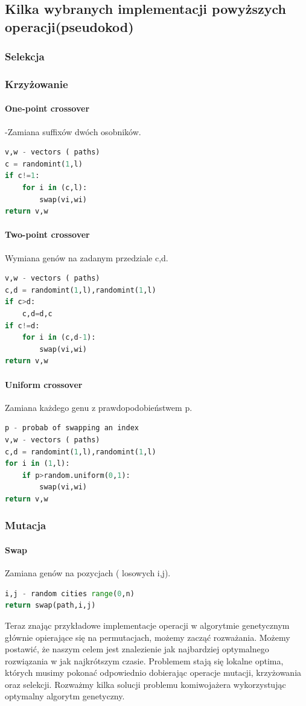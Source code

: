 \documentclass[11pt]{article}
\begin{document}
\subsection{Kilka wybranych implementacji powyższych operacji(pseudokod)}
\subsubsection{Selekcja}




\subsubsection{Krzyżowanie}
\paragraph{One-point crossover}-Zamiana suffixów dwóch osobników.
\begin{lstlisting}[language=Python ]
v,w - vectors ( paths)
c = randomint(1,l)
if c!=1:
	for i in (c,l):
		swap(vi,wi)
return v,w
\end{lstlisting}
\paragraph{Two-point crossover}Wymiana genów na zadanym przedziale c,d.
\begin{lstlisting}[language=Python]
v,w - vectors ( paths)
c,d = randomint(1,l),randomint(1,l)
if c>d:
	c,d=d,c
if c!=d:
	for i in (c,d-1):
		swap(vi,wi)
return v,w
\end{lstlisting}
\paragraph{Uniform crossover}Zamiana każdego genu z prawdopodobieństwem p.
\begin{lstlisting}[language=Python]
p - probab of swapping an index
v,w - vectors ( paths)
c,d = randomint(1,l),randomint(1,l)
for i in (1,l):
	if p>random.uniform(0,1):
		swap(vi,wi)
return v,w
\end{lstlisting}
\subsubsection{Mutacja}
\paragraph{Swap} Zamiana genów na pozycjach ( losowych i,j).
\begin{lstlisting}[language=Python]
i,j - random cities range(0,n)
return swap(path,i,j)
\end{lstlisting}
Teraz znając przykładowe implementacje operacji w algorytmie genetycznym głównie opierające się na permutacjach, możemy zacząć rozważania. Możemy postawić, że naszym celem jest znalezienie jak najbardziej optymalnego rozwiązania w jak najkrótszym czasie. Problemem stają się lokalne optima, których musimy pokonać odpowiednio dobierając operacje mutacji, krzyżowania oraz selekcji. Rozważmy kilka solucji problemu komiwojażera wykorzystując optymalny algorytm genetyczny.
\end{document}
